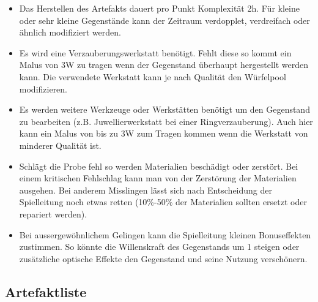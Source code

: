 \documentclass{article}
\begin{document}
\begin{itemize}
\item Das Herstellen des Artefakts dauert pro Punkt Komplexität 2h. Für kleine oder sehr kleine Gegenstände kann der Zeitraum verdopplet, verdreifach oder ähnlich modifiziert werden.
\item Es wird eine Verzauberungswerkstatt benötigt. Fehlt diese so kommt ein Malus von 3W zu tragen wenn der Gegenstand überhaupt hergestellt werden kann. Die verwendete Werkstatt kann je nach Qualität den Würfelpool modifizieren.
\item Es werden weitere Werkzeuge oder Werkstätten benötigt um den Gegenstand zu bearbeiten (z.B. Juwellierwerkstatt bei einer Ringverzauberung). Auch hier kann ein Malus von bis zu 3W zum Tragen kommen wenn die Werkstatt von minderer Qualität ist.
\item Schlägt die Probe fehl so werden Materialien beschädigt oder zerstört. Bei einem kritischen Fehlschlag kann man von der Zerstörung der Materialien ausgehen. Bei anderem Misslingen lässt sich nach Entscheidung der Spielleitung noch etwas retten (10\%-50\% der Materialien sollten ersetzt oder repariert werden).
\item Bei aussergewöhnlichem Gelingen kann die Spielleitung kleinen Bonuseffekten zustimmen. So könnte die Willenskraft des Gegenstands um 1 steigen oder zusätzliche optische Effekte den Gegenstand und seine Nutzung verschönern.
\end{itemize}

\newpage

\begin{center}
\subsection{Artefaktliste}
\end{center}
\end{document}
